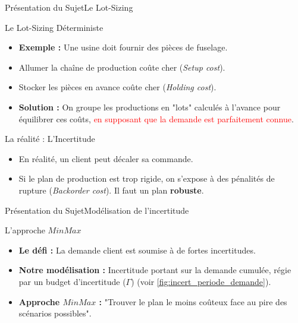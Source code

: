 \documentclass[10pt]{beamer}
\begin{document}
\begin{frame}{Présentation du Sujet}{Le Lot-Sizing}
    \begin{block}{Le Lot-Sizing Déterministe}
        \begin{itemize}
            \item \textbf{Exemple :} Une usine doit fournir des pièces de fuselage.
            \item Allumer la chaîne de production coûte cher (\textit{Setup cost}).
            \item Stocker les pièces en avance coûte cher (\textit{Holding cost}).
            \item \textbf{Solution :} On groupe les productions en "lots" calculés à l'avance pour équilibrer ces coûts, \textcolor{red}{en supposant que la demande est parfaitement connue}.
        \end{itemize}
    \end{block}

    \begin{alertblock}{La réalité : L'Incertitude}
        \begin{itemize}
            \item En réalité, un client peut décaler sa commande.
            \item Si le plan de production est trop rigide, on s'expose à des pénalités de rupture (\textit{Backorder cost}). Il faut un plan \textbf{robuste}.
        \end{itemize}
    \end{alertblock}
\end{frame}

\begin{frame}{Présentation du Sujet}{Modélisation de l'incertitude}
	\begin{block}{L'approche $MinMax$}
		\begin{itemize}
			\item \textbf{Le défi :} La demande client est soumise à de fortes incertitudes.
			\item \textbf{Notre modélisation :} Incertitude portant sur la demande cumulée, régie par un budget d'incertitude ($\Gamma$) (voir \ref{fig:incert_periode_demande}).
			\item \textbf{Approche $MinMax$ :} "Trouver le plan le moins coûteux face au pire des scénarios possibles".
		\end{itemize}
	\end{block}
\end{frame}
\end{document}
